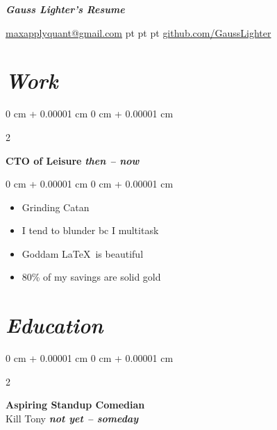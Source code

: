 \documentclass[10pt, letterpaper]{article}
\newenvironment{highlights}{
    \begin{itemize}[
        topsep=0.10 cm,
        parsep=0.1 cm,
        partopsep=0pt,
        itemsep=0pt,
        leftmargin=0 cm + 15pt
    ]
}{
    \end{itemize}
} %
\newenvironment{onecolentry}{
    \begin{adjustwidth}{
        0 cm + 0.00001 cm
    }{
        0 cm + 0.00001 cm
    }
}{
    \end{adjustwidth}
} %
\newenvironment{twocolentry}[2][]{
    \onecolentry
    \def\secondColumn{#2}
    \setcolumnwidth{\fill, 4.5 cm}
    \begin{paracol}{2}
}{
    \switchcolumn \raggedleft \secondColumn
    \end{paracol}
    \endonecolentry
} %
\newenvironment{header}{
    \setlength{\topsep}{0pt}\par\kern\topsep\centering\linespread{1.5}
}{
    \par\kern\topsep
} %
\let\hrefWithoutArrow\href
\begin{document}
    \newcommand{\AND}{\unskip
        \cleaders\copy\ANDbox\hskip\wd\ANDbox
        \ignorespaces
    }
    \newsavebox\ANDbox
    \sbox\ANDbox{$|$}
    
    \begin{header}
        \fontsize{25pt}{25 pt}\selectfont \textbf{\textit{Gauss Lighter’s Resume}}

        \vspace{3 pt}

        \normalsize
        \mbox{\hrefWithoutArrow{mailto:maxapplyquant@gmail.com}{maxapplyquant@gmail.com}}%
         pt%
         pt%
         pt%
        \mbox{\hrefWithoutArrow{https://github.com/GaussLighter}{github.com/GaussLighter}}%
    
    \end{header}

    \vspace{25 pt}

      \section{\textbf{\textit{Work}}}

        
        \begin{twocolentry}{
           \small \textit{\textbf{then -- now}}
        }
        \textbf{CTO of Leisure}\end{twocolentry}

        \vspace{0.1 cm}
        \begin{onecolentry}
            \begin{highlights}
                \item Grinding Catan
                \item I tend to blunder bc I multitask
                \item Goddam \LaTeX\ is beautiful
                \item 80\% of my savings are solid gold
            \end{highlights}
        \end{onecolentry}

        
\vspace{0.2 cm}


\section{\textbf{\textit{Education}}} 

        \begin{twocolentry}{
          \small \textit{\textbf{not yet -- someday}}
        }
            \textbf{Aspiring Standup Comedian} \\ Kill Tony\end{twocolentry}
\end{document}

